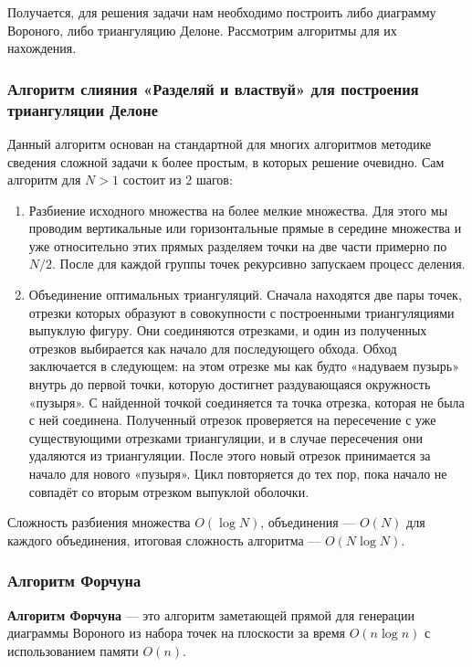 Получается, для решения задачи нам необходимо построить либо диаграмму Вороного, либо триангуляцию Делоне. Рассмотрим алгоритмы для их нахождения.

\subsubsection*{Алгоритм слияния «Разделяй и властвуй» для построения триангуляции Делоне}

Данный алгоритм основан на стандартной для многих алгоритмов методике сведения сложной задачи к более простым, в которых решение очевидно. Сам алгоритм для $N>1$ состоит из 2 шагов:

\begin{enumerate}
    \item Разбиение исходного множества на более мелкие множества. Для этого мы проводим вертикальные или горизонтальные прямые в середине множества и уже относительно этих прямых разделяем точки на две части примерно по $N/2$. После для каждой группы точек рекурсивно запускаем процесс деления.
    \item Объединение оптимальных триангуляций. Сначала находятся две пары точек, отрезки которых образуют в совокупности с построенными триангуляциями выпуклую фигуру. Они соединяются отрезками, и один из полученных отрезков выбирается как начало для последующего обхода. Обход заключается в следующем: на этом отрезке мы как будто «надуваем пузырь» внутрь до первой точки, которую достигнет раздувающаяся окружность «пузыря». С найденной точкой соединяется та точка отрезка, которая не была с ней соединена. Полученный отрезок проверяется на пересечение с уже существующими отрезками триангуляции, и в случае пересечения они удаляются из триангуляции. После этого новый отрезок принимается за начало для нового «пузыря». Цикл повторяется до тех пор, пока начало не совпадёт со вторым отрезком выпуклой оболочки.
\end{enumerate}

Сложность разбиения множества $O(\log N)$, объединения —
$O(N)$ для каждого объединения, итоговая сложность алгоритма —
$O(N \log N)$.

\subsubsection*{Алгоритм Форчуна}

\textbf{Алгоритм Форчуна} — это алгоритм заметающей прямой для генерации диаграммы Вороного из набора точек на плоскости за время $O(n \log n)$ с использованием памяти $O(n)$.

